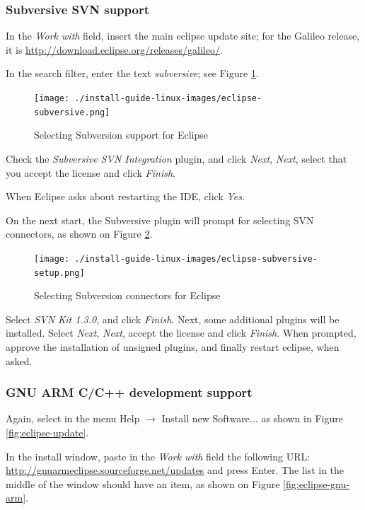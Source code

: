 \documentclass[a4paper, 10pt]{article}
\begin{document}
\subsubsection{Subversive SVN support}


In the \emph{Work with} field, insert the main eclipse update site;
for the Galileo release, it is
\url{http://download.eclipse.org/releases/galileo/}.

In the search filter, enter the text \emph{subversive};
see Figure \ref{fig:eclipse-subversive}.

    \begin{figure}[H]
    \centering
        \texttt{[image: ./install-guide-linux-images/eclipse-subversive.png]}
        \caption{Selecting Subversion support for Eclipse}
        \label{fig:eclipse-subversive}
    \end{figure}

Check the \emph{Subversive SVN Integration} plugin, and click \emph{Next},
\emph{Next}, select that you accept the license and click \emph{Finish}.

When Eclipse asks about restarting the IDE, click \emph{Yes}.

On the next start, the Subversive plugin will prompt for selecting
SVN connectors, as shown on Figure \ref{fig:eclipse-subversive-setup}.

    \begin{figure}[H]
    \centering
        \texttt{[image: ./install-guide-linux-images/eclipse-subversive-setup.png]}
        \caption{Selecting Subversion connectors for Eclipse}
        \label{fig:eclipse-subversive-setup}
    \end{figure}


Select \emph{SVN Kit 1.3.0}, and click \emph{Finish}. Next, some additional plugins
will be installed.
Select \emph{Next},
\emph{Next}, accept the license and click \emph{Finish}.
When prompted, approve the installation of unsigned plugins,
and finally restart eclipse, when asked.


\subsubsection{GNU ARM C/C++ development support}

Again, select in the menu Help $\rightarrow$ Install new Software... as shown in
Figure \ref{fig:eclipse-update}.

In the install window, paste in the \emph{Work with} field
the following URL:
\url{http://gnuarmeclipse.sourceforge.net/updates} and press Enter.
The list in the middle of the window should have an item, as shown on
Figure \ref{fig:eclipse-gnu-arm}.
\end{document}
